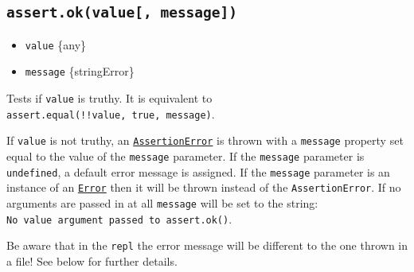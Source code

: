 \subsection{\texorpdfstring{\texttt{assert.ok(value{[},\ message{]})}}{assert.ok(value{[}, message{]})}}\label{assert.okvalue-message}

\begin{itemize}
\tightlist
\item
  \texttt{value} \{any\}
\item
  \texttt{message} \{string\textbar Error\}
\end{itemize}

Tests if \texttt{value} is truthy. It is equivalent to
\texttt{assert.equal(!!value,\ true,\ message)}.

If \texttt{value} is not truthy, an
\hyperref[class-assertassertionerror]{\texttt{AssertionError}} is thrown
with a \texttt{message} property set equal to the value of the
\texttt{message} parameter. If the \texttt{message} parameter is
\texttt{undefined}, a default error message is assigned. If the
\texttt{message} parameter is an instance of an
\href{errors.md\#class-error}{\texttt{Error}} then it will be thrown
instead of the \texttt{AssertionError}. If no arguments are passed in at
all \texttt{message} will be set to the string:
\texttt{\textquotesingle{}No\ value\ argument\ passed\ to\ \textasciigrave{}assert.ok()\textasciigrave{}\textquotesingle{}}.

Be aware that in the \texttt{repl} the error message will be different
to the one thrown in a file! See below for further details.

